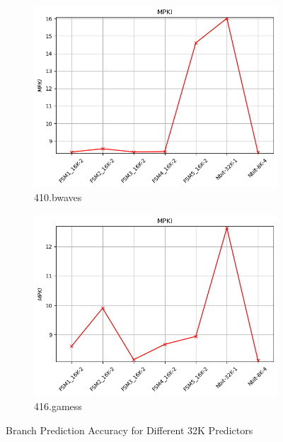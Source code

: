 \documentclass{article}
\begin{document}
\begin{figure}[H]
    \vspace{0.5cm} %

    \begin{subfigure}[b]{0.45\textwidth}
        \includegraphics[width=\textwidth]{figures/5_3_c/410.bwaves.cslab_branch_preds_ref.out.png}
        \caption{410.bwaves}
        \label{fig:plot35}
    \end{subfigure}
    \hfill
    \begin{subfigure}[b]{0.45\textwidth}
        \includegraphics[width=\textwidth]{figures/5_3_c/416.gamess.cslab_branch_preds_ref.out.png}
        \caption{416.gamess}
        \label{fig:plot36}
    \end{subfigure}

    \vspace{0.5cm} %

    \caption{Branch Prediction Accuracy for Different 32K Predictors}
    \label{fig:32K}
\end{figure}
\end{document}
